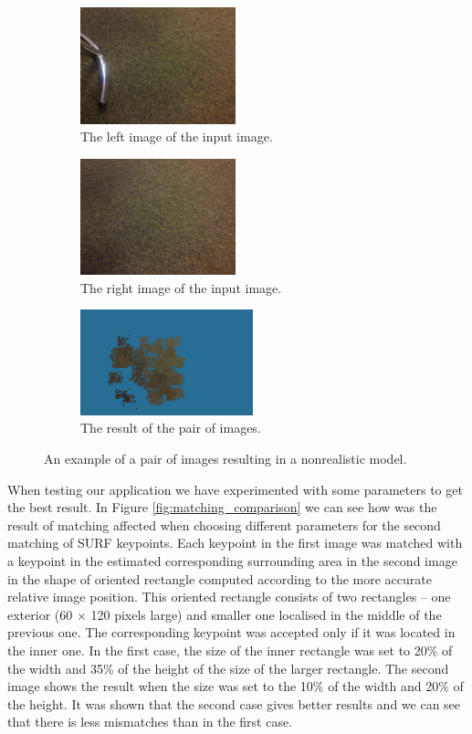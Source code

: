 \begin{figure}[h]
\centering

\begin{subfigure}[b]{0.45\textwidth}
\centering
\includegraphics[width=4.5cm]{img/bad_input1.png}
\caption{The left image of the input image.} \label{x0}
\end{subfigure}
\begin{subfigure}[b]{0.45\textwidth}
\centering
\includegraphics[width=4.5cm]{img/bad_input2}
\caption{The right image of the input image.} \label{x2}
\end{subfigure}
\begin{subfigure}[b]{0.45\textwidth}
\centering
\includegraphics[width=5.0cm]{img/bad_result.png}
\caption{The result of the pair of images.} \label{x3}
\end{subfigure}

\caption[]{An example of a pair of images resulting in a nonrealistic model.} 
\label{fig:bad_example}
\end{figure}

When testing our application we have experimented with some parameters to get the best result.
In Figure \ref{fig:matching_comparison} we can see how was the result of matching affected when choosing different parameters for the second matching of SURF keypoints.
Each keypoint in the first image was matched with a keypoint in the estimated corresponding surrounding area in the second image in the shape of oriented rectangle computed according to the more accurate relative image position.
This oriented rectangle consists of two rectangles -- one exterior (60 $\times$ 120 pixels large) and smaller one localised in the middle of the previous one.
The corresponding keypoint was accepted only if it was located in the inner one.
In the first case, the size of the inner rectangle was set to 20\% of the width and 35\% of the height of the size of the larger rectangle.
The second image shows the result when the size was set to the 10\% of the width and 20\% of the height.
It was shown that the second case gives better results and we can see that there is less mismatches than in the first case.

